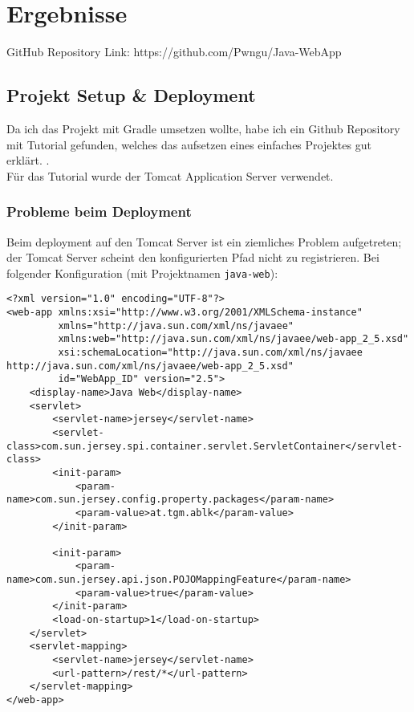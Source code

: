
\section{Ergebnisse}
\label{sec:Ergebnisse}

GitHub Repository Link: https://github.com/Pwngu/Java-WebApp

\subsection{Projekt Setup \& Deployment}
Da ich das Projekt mit Gradle umsetzen wollte, habe ich ein Github Repository mit Tutorial gefunden, welches das aufsetzen eines einfaches Projektes gut erklärt. \cite{gradle-jersey-tutorial}.\\
Für das Tutorial wurde der Tomcat Application Server \cite{tomcat-hp} verwendet. 

\subsubsection{Probleme beim Deployment}

Beim deployment auf den Tomcat Server ist ein ziemliches Problem aufgetreten; der Tomcat Server scheint den konfigurierten Pfad nicht zu registrieren. Bei folgender Konfiguration (mit Projektnamen \texttt{java-web}):

\begin{lstlisting}[style=XML, caption=web.xml]
<?xml version="1.0" encoding="UTF-8"?>
<web-app xmlns:xsi="http://www.w3.org/2001/XMLSchema-instance"
         xmlns="http://java.sun.com/xml/ns/javaee"
         xmlns:web="http://java.sun.com/xml/ns/javaee/web-app_2_5.xsd"
         xsi:schemaLocation="http://java.sun.com/xml/ns/javaee http://java.sun.com/xml/ns/javaee/web-app_2_5.xsd"
         id="WebApp_ID" version="2.5">
    <display-name>Java Web</display-name>
    <servlet>
        <servlet-name>jersey</servlet-name>
        <servlet-class>com.sun.jersey.spi.container.servlet.ServletContainer</servlet-class>
        <init-param>
            <param-name>com.sun.jersey.config.property.packages</param-name>
            <param-value>at.tgm.ablk</param-value>
        </init-param>

        <init-param>
            <param-name>com.sun.jersey.api.json.POJOMappingFeature</param-name>
            <param-value>true</param-value>
        </init-param>
        <load-on-startup>1</load-on-startup>
    </servlet>
    <servlet-mapping>
        <servlet-name>jersey</servlet-name>
        <url-pattern>/rest/*</url-pattern>
    </servlet-mapping>
</web-app>
\end{lstlisting}

